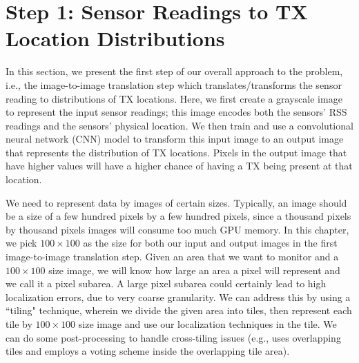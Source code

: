 \section{\our Step 1: Sensor Readings to TX Location Distributions}
\label{sec:translate}

In this section, we present the first step of our overall approach to the \mtl problem, i.e., 
the image-to-image translation step which translates/transforms the sensor reading to distributions
of TX locations. Here, we first create a grayscale image to represent the input sensor readings;
this image encodes both the sensors' RSS readings and the sensors' physical location. We then train and use
a convolutional neural network (CNN) model to transform this input image
to an output image that represents the distribution of TX locations. Pixels in the output image that have higher values will have a higher chance of having a TX being present at that location. 
 
We need to represent data by images of certain sizes.
Typically, an image should be a size of a few hundred pixels by a few hundred pixels, since a thousand pixels by thousand pixels images will consume too much GPU memory.
In this chapter, we pick $100\times 100$ as the size for both our input and output images in the first image-to-image translation step.
Given an area that we want to monitor and a $100\times100$ size image, we will know how large an area a pixel will represent and we call it a pixel subarea.
A large pixel subarea could certainly lead to high localization errors, due
to very coarse granularity. We can address this by using a ``tiling"
technique, wherein we divide the given area into tiles, then represent each 
tile by $100\times100$ size image and use our localization techniques in the tile.
We can do some post-processing to handle cross-tiling issues (e.g., \cite{icccn20-deeptxfinder} uses overlapping tiles and employs a voting scheme inside the overlapping tile area).
 
